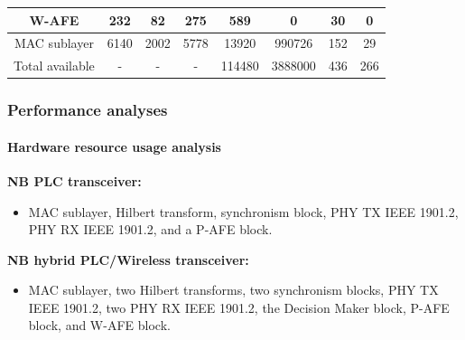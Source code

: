 \documentclass[mathserif]{beamer}
\newcommand{\wait}{\vfill}
\begin{document}
\begin{frame}
\begin{table}[h]
{\begin{tabular}{c|c|c|c|c|c|c|c}
		W-AFE                  & 232          & 82                & 275              & 589      & 0                            & 30                    & 0                    \\ \hline
		MAC sublayer           & 6140         & 2002              & 5778             & \alert{13920}    & 990726                       & 152                   & 29                   \\
		\hline
		Total available           & -         & -              & -             &  114480    & 3888000                       & 436                   & 266                   \\
		 \hline
	\end{tabular}
}
\end{table}
\end{frame}

\begin{frame}
	\frametitle{Performance analyses}
	\framesubtitle{Hardware resource usage analysis}
	\textbf{NB PLC transceiver:}
	\begin{itemize}
		\item MAC sublayer, Hilbert transform, synchronism block, PHY TX IEEE 1901.2, PHY RX IEEE 1901.2, and a P-AFE block. \wait
	\end{itemize}
	
	\textbf{NB hybrid PLC/Wireless transceiver:} 
	\begin{itemize}
		\item MAC sublayer, two Hilbert transforms, two synchronism blocks, PHY TX IEEE 1901.2, two PHY RX IEEE 1901.2, the Decision Maker block, P-AFE block, and W-AFE block. \wait
	\end{itemize}
\end{frame}
\end{document}
